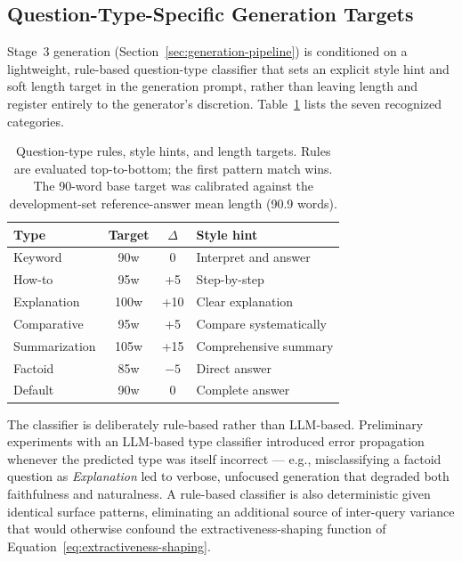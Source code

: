\subsection{Question-Type-Specific Generation Targets}
\label{sec:question-type-targets}

Stage~3 generation (Section~\ref{sec:generation-pipeline}) is conditioned on a lightweight, rule-based
question-type classifier that sets an explicit style hint and soft length target in the generation
prompt, rather than leaving length and register entirely to the generator's discretion.
Table~\ref{tab:question-type-targets} lists the seven recognized categories.

\begin{table}[h]
\centering
\begin{tabular}{lccl}
\toprule
\textbf{Type} & \textbf{Target} & \textbf{$\Delta$} & \textbf{Style hint} \\
\midrule
Keyword        & 90w  & 0   & Interpret and answer \\
How-to         & 95w  & +5  & Step-by-step \\
Explanation    & 100w & +10 & Clear explanation \\
Comparative    & 95w  & +5  & Compare systematically \\
Summarization  & 105w & +15 & Comprehensive summary \\
Factoid        & 85w  & $-5$ & Direct answer \\
Default        & 90w  & 0   & Complete answer \\
\bottomrule
\end{tabular}
\caption{Question-type rules, style hints, and length targets. Rules are evaluated top-to-bottom;
the first pattern match wins. The 90-word base target was calibrated against the development-set
reference-answer mean length (90.9 words).}
\label{tab:question-type-targets}
\end{table}

The classifier is deliberately rule-based rather than LLM-based. Preliminary experiments with an
LLM-based type classifier introduced error propagation whenever the predicted type was itself
incorrect — e.g., misclassifying a factoid question as \emph{Explanation} led to verbose, unfocused
generation that degraded both faithfulness and naturalness. A rule-based classifier is also
deterministic given identical surface patterns, eliminating an additional source of inter-query
variance that would otherwise confound the extractiveness-shaping function of
Equation~\eqref{eq:extractiveness-shaping}.
